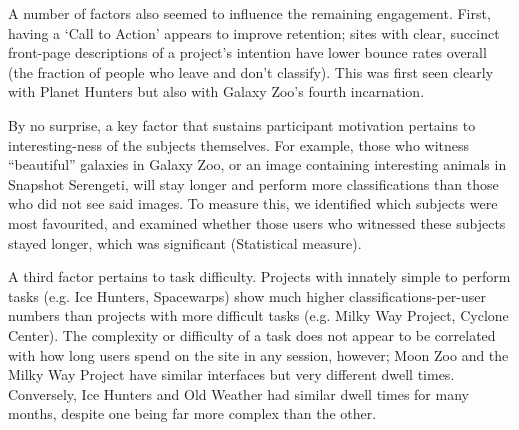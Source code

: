 \documentclass{sigchi}
\begin{document}
A number of factors also seemed to influence the remaining engagement.  First, having a `Call to Action' appears to improve retention; sites with clear, succinct front-page descriptions of a project's intention have lower bounce rates overall (the fraction of people who leave and don't classify). This was first seen clearly with Planet Hunters but also with Galaxy Zoo's fourth incarnation. %

By no surprise, a key factor that sustains participant motivation pertains to interesting-ness of the subjects themselves.  For example, those who witness ``beautiful'' galaxies in Galaxy Zoo, or an image containing interesting animals in Snapshot Serengeti, will stay longer and perform more classifications than those who did not see said images.  To measure this, we identified which subjects were most favourited, and examined whether those users who witnessed these subjects stayed longer, which was significant (Statistical measure). %


A third factor pertains to task difficulty. Projects with innately simple to perform tasks (e.g. Ice Hunters, Spacewarps) show much higher classifications-per-user numbers than projects with more difficult tasks (e.g. Milky Way Project, Cyclone Center). The complexity or difficulty of a task does not appear to be correlated with how long users spend on the site in any session, however; Moon Zoo and the Milky Way Project have similar interfaces but very different dwell times. Conversely, Ice Hunters and Old Weather had similar dwell times for many months, despite one being far more complex than the other.



\end{document}

